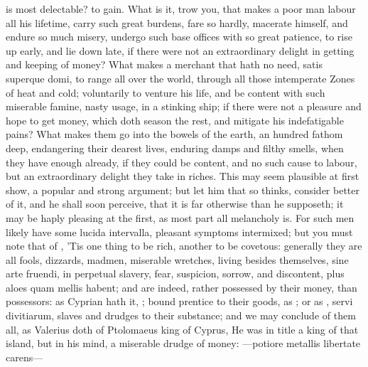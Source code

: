 {is most delectable? to gain. What is it, trow you, that makes a poor
man labour all his lifetime, carry such great burdens, fare so hardly,
macerate himself, and endure so much misery, undergo such base offices
with so great patience, to rise up early, and lie down late, if there
were not an extraordinary delight in getting and keeping of money? What
makes a merchant that hath no need, satis superque domi, to range all
over the world, through all those intemperate Zones of heat and
cold; voluntarily to venture his life, and be content with such
miserable famine, nasty usage, in a stinking ship; if there were not a
pleasure and hope to get money, which doth season the rest, and
mitigate his indefatigable pains? What makes them go into the bowels of
the earth, an hundred fathom deep, endangering their dearest lives,
enduring damps and filthy smells, when they have enough already, if
they could be content, and no such cause to labour, but an
extraordinary delight they take in riches. This may seem plausible at
first show, a popular and strong argument; but let him that so thinks,
consider better of it, and he shall soon perceive, that it is far
otherwise than he supposeth; it may be haply pleasing at the first, as
most part all melancholy is. For such men likely have some lucida
intervalla, pleasant symptoms intermixed; but you must note that of
\Chrysostom{}, 'Tis one thing to be rich, another to be covetous:
generally they are all fools, dizzards, madmen, miserable
wretches, living besides themselves, sine arte fruendi, in perpetual
slavery, fear, suspicion, sorrow, and discontent, plus aloes quam
mellis habent; and are indeed, rather possessed by their money, than
possessors: as Cyprian hath it, ; bound
prentice to their goods, as \Pliny{}; or as \Chrysostom{}, servi
divitiarum, slaves and drudges to their substance; and we may conclude
of them all, as Valerius doth of Ptolomaeus king of Cyprus, He
was in title a king of that island, but in his mind, a miserable drudge
of money:
---potiore metallis
libertate carens---

}
